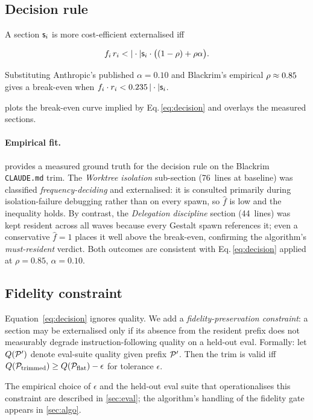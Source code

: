 \subsection{Decision rule}

A section $\mathsf{s}_i$ is more cost-efficient externalised iff

\begin{equation}
  f_i \,r_i < |\cdot|{\mathsf{s}_i}
    \cdot \big( (1 - \rho) + \rho \alpha \big) .
  \label{eq:decision}
\end{equation}

Substituting Anthropic's published $\alpha = 0.10$ and Blackrim's
empirical $\rho \approx 0.85$ gives a break-even when
$f_i \cdot r_i < 0.235\,|\cdot|{\mathsf{s}_i}$.

 plots the break-even curve
implied by Eq.\,\eqref{eq:decision} and overlays the measured sections.


\paragraph{Empirical fit.}
 provides a measured ground truth for the
decision rule on the Blackrim \texttt{CLAUDE.md} trim.  The
\textit{Worktree isolation} sub-section (76~lines at baseline) was
classified \emph{frequency-deciding} and externalised: it is consulted
primarily during isolation-failure debugging rather than on every spawn,
so $\hat{f}$ is low and the inequality holds.  By contrast, the
\textit{Delegation discipline} section (44~lines) was kept resident
across all waves because every Gestalt spawn references it; even a
conservative $\hat{f} = 1$ places it well above the break-even,
confirming the algorithm's \emph{must-resident} verdict.
Both outcomes are consistent with Eq.\,\eqref{eq:decision} applied
at $\rho = 0.85$, $\alpha = 0.10$.

\subsection{Fidelity constraint}

Equation~\eqref{eq:decision} ignores quality. We add a
\emph{fidelity-preservation constraint}: a section may be externalised
only if its absence from the resident prefix does not measurably
degrade instruction-following quality on a held-out eval. Formally:
let $Q(\mathcal{P}')$ denote eval-suite quality given prefix $\mathcal{P}'$.
Then the trim is valid iff $Q(\mathcal{P}_{\mathrm{trimmed}}) \geq
Q(\mathcal{P}_{\mathrm{flat}}) - \epsilon$ for tolerance $\epsilon$.

The empirical choice of $\epsilon$ and the held-out eval suite that
operationalises this constraint are described in \cref{sec:eval};
the algorithm's handling of the fidelity gate appears in \cref{sec:algo}.
